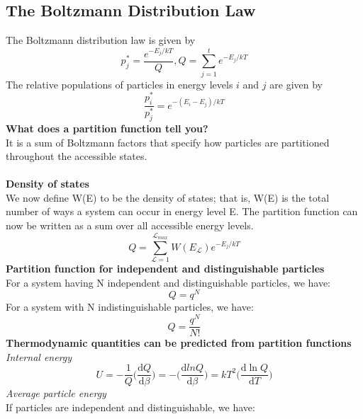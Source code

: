 \documentclass[8pt]{article}
\numberwithin{equation}{section}
\begin{document}
\begin{multicols}{2}
\section{The Boltzmann Distribution Law}
The Boltzmann distribution law is given by 
\begin{equation}
p_{j}^{*}=\frac{e^{-E_{j}/kT}}{Q}, Q=\sum_{j=1}^{t}e^{-E_{j}/kT} \tag{10.9}
\end{equation}
The relative populations of particles in energy levels $i$ and $j$ are given by
\begin{equation}
\frac{p_{i}^{*}}{p_{j}^{*}}=e^{-(E_{i}-E_{j})/kT} \tag{10.10}
\end{equation}
\textbf{What does a partition function tell you?} \\
It is a sum of Boltzmann factors that specify how particles are partitioned throughout the accessible states.  \\ \\
\textbf{Density of states} \\
We now define W(E) to be the density of states; that is, W(E) is the total number of ways a system can occur in energy level E. The partition function can now be written as a sum over all accessible energy levels.
\begin{equation}
Q=\sum_{\mathscr{L}=1}^{\mathscr{L}_{max}}W(E_{\mathscr{L}})e^{-E_{j}/kT} \tag{10.23}
\end{equation}
\textbf{Partition function for independent and distinguishable particles} \\
For a system having N independent and distinguishable particles, we have: 
\begin{equation}
Q=q^{N} \tag{10.28}
\end{equation}
For a system with N indistinguishable particles, we have: 
\begin{equation}
Q=\frac{q^{N}}{N!} \tag{10.30}
\end{equation}
\textbf{Thermodynamic quantities can be predicted from partition functions} \\
\textit{Internal energy} 
\begin{equation}
U=-\frac{1}{Q}\bigg(\frac{\mathrm{d}Q}{\mathrm{d}\beta}\bigg)=-\bigg(\frac{\mathrm{d}ln{Q}}{\mathrm{d}\beta}\bigg)=kT^{2}\bigg(\frac{\mathrm{d}\ln{Q}}{\mathrm{d}T}\bigg) \tag{10.33}
\end{equation}
\textit{Average particle energy} \\
If particles are independent and distinguishable, we have: 
\begin{equation}

\end{equation}
\end{multicols}
\end{document}
